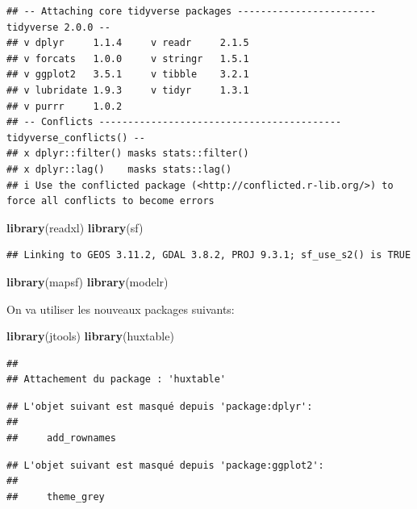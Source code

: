 \documentclass[
]{book}
\newenvironment{Shaded}{\begin{snugshade}}{\end{snugshade}}
\newcommand{\FunctionTok}[1]{\textcolor[rgb]{0.13,0.29,0.53}{\textbf{#1}}}
\newcommand{\NormalTok}[1]{#1}
\begin{document}
\begin{verbatim}
## -- Attaching core tidyverse packages ------------------------ tidyverse 2.0.0 --
## v dplyr     1.1.4     v readr     2.1.5
## v forcats   1.0.0     v stringr   1.5.1
## v ggplot2   3.5.1     v tibble    3.2.1
## v lubridate 1.9.3     v tidyr     1.3.1
## v purrr     1.0.2     
## -- Conflicts ------------------------------------------ tidyverse_conflicts() --
## x dplyr::filter() masks stats::filter()
## x dplyr::lag()    masks stats::lag()
## i Use the conflicted package (<http://conflicted.r-lib.org/>) to force all conflicts to become errors
\end{verbatim}

\begin{Shaded}
\begin{Highlighting}[]
\FunctionTok{library}\NormalTok{(readxl)}
\FunctionTok{library}\NormalTok{(sf)}
\end{Highlighting}
\end{Shaded}

\begin{verbatim}
## Linking to GEOS 3.11.2, GDAL 3.8.2, PROJ 9.3.1; sf_use_s2() is TRUE
\end{verbatim}

\begin{Shaded}
\begin{Highlighting}[]
\FunctionTok{library}\NormalTok{(mapsf)}
\FunctionTok{library}\NormalTok{(modelr)}
\end{Highlighting}
\end{Shaded}

On va utiliser les nouveaux packages suivants:

\begin{Shaded}
\begin{Highlighting}[]
\FunctionTok{library}\NormalTok{(jtools)}
\FunctionTok{library}\NormalTok{(huxtable)}
\end{Highlighting}
\end{Shaded}

\begin{verbatim}
## 
## Attachement du package : 'huxtable'
\end{verbatim}

\begin{verbatim}
## L'objet suivant est masqué depuis 'package:dplyr':
## 
##     add_rownames
\end{verbatim}

\begin{verbatim}
## L'objet suivant est masqué depuis 'package:ggplot2':
## 
##     theme_grey
\end{verbatim}
\end{document}
